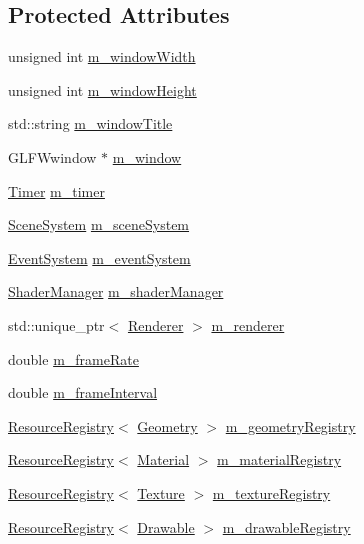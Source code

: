 \subsection*{Protected Attributes}
\begin{DoxyCompactItemize}
\item 
unsigned int \mbox{\hyperlink{classec_1_1_window_a123952ed65bb1099068dd7ca2781bd4b}{m\+\_\+window\+Width}}
\item 
unsigned int \mbox{\hyperlink{classec_1_1_window_a1beba0a39ddf045ba3ec441b2147a874}{m\+\_\+window\+Height}}
\item 
std\+::string \mbox{\hyperlink{classec_1_1_window_a2f9c3a96c57440be25c92fc09e8913d2}{m\+\_\+window\+Title}}
\item 
G\+L\+F\+Wwindow $\ast$ \mbox{\hyperlink{classec_1_1_window_a6d40786a23714fff2de92ed74e8eb10e}{m\+\_\+window}}
\item 
\mbox{\hyperlink{classec_1_1_timer}{Timer}} \mbox{\hyperlink{classec_1_1_window_af826de73c15768bf1a4ee5dbff0e377c}{m\+\_\+timer}}
\item 
\mbox{\hyperlink{classec_1_1_scene_system}{Scene\+System}} \mbox{\hyperlink{classec_1_1_window_a5c50dfac91e6105a6862693e71976a3e}{m\+\_\+scene\+System}}
\item 
\mbox{\hyperlink{classec_1_1_event_system}{Event\+System}} \mbox{\hyperlink{classec_1_1_window_afb083ee014fec3d0f141f24ce8c463a4}{m\+\_\+event\+System}}
\item 
\mbox{\hyperlink{classec_1_1_shader_manager}{Shader\+Manager}} \mbox{\hyperlink{classec_1_1_window_ad4b04fabdef20b69206562d2703a7bf9}{m\+\_\+shader\+Manager}}
\item 
std\+::unique\+\_\+ptr$<$ \mbox{\hyperlink{classec_1_1_renderer}{Renderer}} $>$ \mbox{\hyperlink{classec_1_1_window_af140bfa1dd5635f6cd4b200fc88247bb}{m\+\_\+renderer}}
\item 
double \mbox{\hyperlink{classec_1_1_window_aa7245d9cfc57373c805b63ba3e8826f8}{m\+\_\+frame\+Rate}}
\item 
double \mbox{\hyperlink{classec_1_1_window_a6c56361d6931e3a5a6dcfe7a08c25e09}{m\+\_\+frame\+Interval}}
\item 
\mbox{\hyperlink{classec_1_1_resource_registry}{Resource\+Registry}}$<$ \mbox{\hyperlink{classec_1_1_geometry}{Geometry}} $>$ \mbox{\hyperlink{classec_1_1_window_ac9bc9f64ecfe087b7423195c505120d7}{m\+\_\+geometry\+Registry}}
\item 
\mbox{\hyperlink{classec_1_1_resource_registry}{Resource\+Registry}}$<$ \mbox{\hyperlink{classec_1_1_material}{Material}} $>$ \mbox{\hyperlink{classec_1_1_window_a4b20defc21abe2eb397a09e389cad419}{m\+\_\+material\+Registry}}
\item 
\mbox{\hyperlink{classec_1_1_resource_registry}{Resource\+Registry}}$<$ \mbox{\hyperlink{classec_1_1_texture}{Texture}} $>$ \mbox{\hyperlink{classec_1_1_window_aeea5c28c3ae7ef5cf43472f506410abe}{m\+\_\+texture\+Registry}}
\item 
\mbox{\hyperlink{classec_1_1_resource_registry}{Resource\+Registry}}$<$ \mbox{\hyperlink{classec_1_1_drawable}{Drawable}} $>$ \mbox{\hyperlink{classec_1_1_window_a1c72dfdc44a79fe7d70456258db7064c}{m\+\_\+drawable\+Registry}}
\end{DoxyCompactItemize}


